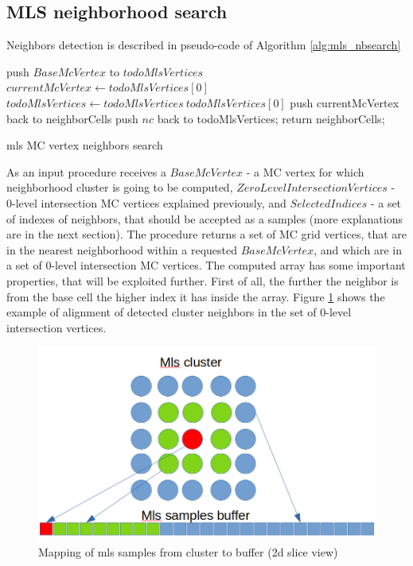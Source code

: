 \subsection{MLS neighborhood search}
Neighbors detection is described in pseudo-code of Algorithm \ref{alg:mls_nbsearch}
\begin{algorithm}[H]
	\scriptsize
	\begin{algorithmic}
		\State push $BaseMcVertex$ to $todoMlsVertices$
			\State $currentMcVertex \gets todoMlsVertices[0]$
			\State $todoMlsVertices \gets todoMlsVertices \ todoMlsVertices[0]$
				\State push currentMcVertex back to neighborCells
			\EndIf
					\State push $nc$ back to todoMlsVertices;
				\EndIf
			\EndFor
		\EndWhile
		return neighborCells;
	\end{algorithmic}
	\caption{mls MC vertex neighbors search}
	\label{alg:mls_nbsearch}
\end{algorithm}
As an input procedure receives a $BaseMcVertex$ - a MC vertex for which neighborhood cluster is going to be computed, $ZeroLevelIntersectionVertices$ - 0-level intersection MC vertices explained previously, and $SelectedIndices$ - a set of indexes of neighbors, that should be accepted as a samples (more explanations are in the next section). The procedure returns a set of MC grid vertices, that are in the nearest neighborhood within a requested $BaseMcVertex$, and which are in a set of 0-level intersection MC vertices. The computed array has some important properties, that will be exploited further. First of all, the further the neighbor is from the base cell the higher index it has inside the array. Figure \ref{fig:mls_neighbor_alignment} shows the example of alignment of detected cluster neighbors in the set of 0-level intersection vertices.\\
\begin{figure}[H]
	\begin{center}
		\includegraphics[width=\textwidth]{figures/MlsSamplesBufferAlignment.png}
	\end{center}
	\caption{Mapping of mls samples from cluster to buffer (2d slice view)} \label{fig:mls_neighbor_alignment}
\end{figure}
